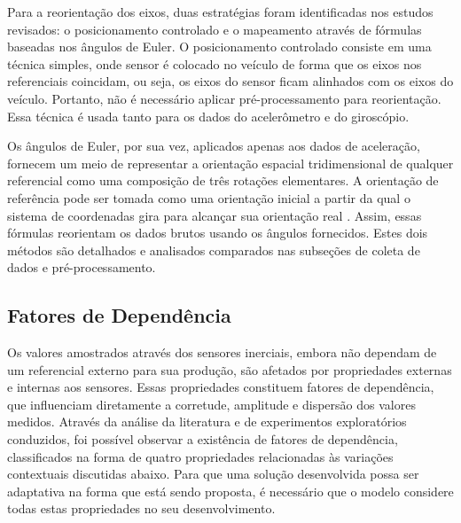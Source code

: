 Para a reorientação dos eixos, duas estratégias foram identificadas nos estudos revisados: o posicionamento controlado e o mapeamento através de fórmulas baseadas nos ângulos de Euler. O posicionamento controlado consiste em uma técnica simples, onde sensor é colocado no veículo de forma que os eixos nos referenciais coincidam, ou seja, os eixos do sensor ficam alinhados com os eixos do veículo. Portanto, não é necessário aplicar pré-processamento para reorientação. Essa técnica é usada tanto para os dados do acelerômetro e do giroscópio. 

Os ângulos de Euler, por sua vez, aplicados apenas aos dados de aceleração, fornecem um meio de representar a orientação espacial tridimensional de qualquer referencial como uma composição de três rotações elementares. A orientação de referência pode ser tomada como uma orientação inicial a partir da qual o sistema de coordenadas gira para alcançar sua orientação real \cite{Singh2017}. Assim, essas fórmulas reorientam os dados brutos usando os ângulos fornecidos. Estes dois métodos são detalhados e analisados comparados nas subseções de coleta de dados e pré-processamento. 

\subsection{Fatores de Dependência}

Os valores amostrados através dos sensores inerciais, embora não dependam de um referencial externo para sua produção, são afetados por propriedades externas e internas aos sensores. Essas propriedades constituem fatores de dependência, que influenciam diretamente a corretude, amplitude e dispersão dos valores medidos. Através da análise da literatura e de experimentos exploratórios conduzidos, foi possível observar a existência de fatores de dependência, classificados na forma de quatro propriedades relacionadas às variações contextuais discutidas abaixo. Para que uma solução desenvolvida possa ser adaptativa na forma que está sendo proposta, é necessário que o modelo considere todas estas propriedades no seu desenvolvimento.

